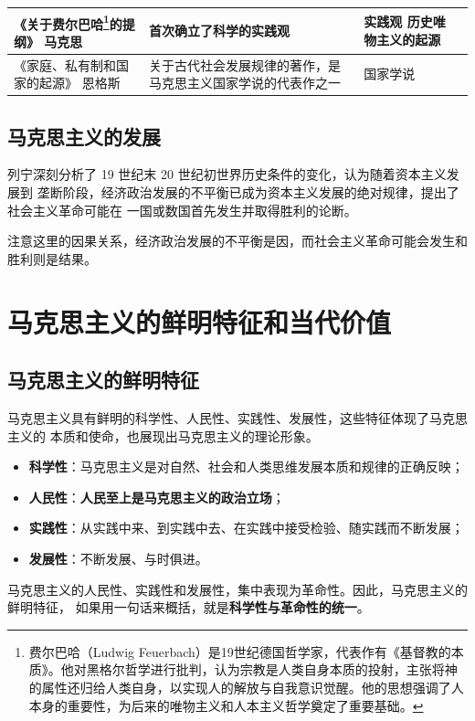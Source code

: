 \documentclass[11pt, UTF8]{book} %
\begin{document}
{\begin{longtable}{p{}|p{}p{}p{}}
    《关于费尔巴哈\footnote{
        费尔巴哈（Ludwig Feuerbach）是19世纪德国哲学家，代表作有《基督教的本质》。他对黑格尔哲学进行批判，认为宗教是人类自身本质的投射，主张将神的属性还归给人类自身，以实现人的解放与自我意识觉醒。他的思想强调了人本身的重要性，为后来的唯物主义和人本主义哲学奠定了重要基础。
    }的提纲》 \newline 马克思 
    & 首次确立了科学的实践观 
    & 实践观 \newline 历史唯物主义的起源 \\
    \hline
    《家庭、私有制和国家的起源》 \newline 恩格斯 
    & 关于古代社会发展规律的著作，是马克思主义国家学说的代表作之一 
    & 国家学说 \\ 
    \hline
\end{longtable}}

\subsection{马克思主义的发展}

列宁深刻分析了 19 世纪末 20 世纪初世界历史条件的变化，认为随着资本主义发展到
垄断阶段，经济政治发展的不平衡已成为资本主义发展的绝对规律，提出了社会主义革命可能在
一国或数国首先发生并取得胜利的论断。
\begin{remark}
    注意这里的因果关系，经济政治发展的不平衡是因，而社会主义革命可能会发生和胜利则是结果。
\end{remark}




\section{马克思主义的鲜明特征和当代价值}

\subsection{马克思主义的鲜明特征}

马克思主义具有鲜明的科学性、人民性、实践性、发展性，这些特征体现了马克思主义的
本质和使命，也展现出马克思主义的理论形象。
\begin{itemize}[itemsep=0pt]
    \item \textbf{科学性}：马克思主义是对自然、社会和人类思维发展本质和规律的正确反映；
    \item \textbf{人民性}：\textbf{人民至上是马克思主义的政治立场}；
    \item \textbf{实践性}：从实践中来、到实践中去、在实践中接受检验、随实践而不断发展；
    \item \textbf{发展性}：不断发展、与时俱进。
\end{itemize}
马克思主义的人民性、实践性和发展性，集中表现为革命性。因此，马克思主义的鲜明特征，
如果用一句话来概括，就是\textbf{科学性与革命性的统一}。
\end{document}
